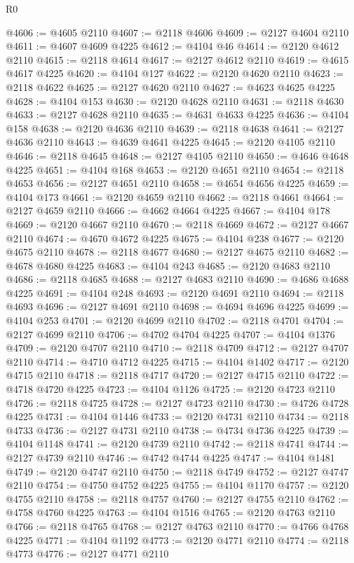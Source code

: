 \begin{lexlean}{R0}
\begin{coremodule}
@4606 := @4605 @2110
@4607 := @2118 @4606
@4609 := @2127 @4604 @2110
@4611 := @4607 @4609 @4225
@4612 := @4104 @46
@4614 := @2120 @4612 @2110
@4615 := @2118 @4614
@4617 := @2127 @4612 @2110
@4619 := @4615 @4617 @4225
@4620 := @4104 @127
@4622 := @2120 @4620 @2110
@4623 := @2118 @4622
@4625 := @2127 @4620 @2110
@4627 := @4623 @4625 @4225
@4628 := @4104 @153
@4630 := @2120 @4628 @2110
@4631 := @2118 @4630
@4633 := @2127 @4628 @2110
@4635 := @4631 @4633 @4225
@4636 := @4104 @158
@4638 := @2120 @4636 @2110
@4639 := @2118 @4638
@4641 := @2127 @4636 @2110
@4643 := @4639 @4641 @4225
@4645 := @2120 @4105 @2110
@4646 := @2118 @4645
@4648 := @2127 @4105 @2110
@4650 := @4646 @4648 @4225
@4651 := @4104 @168
@4653 := @2120 @4651 @2110
@4654 := @2118 @4653
@4656 := @2127 @4651 @2110
@4658 := @4654 @4656 @4225
@4659 := @4104 @173
@4661 := @2120 @4659 @2110
@4662 := @2118 @4661
@4664 := @2127 @4659 @2110
@4666 := @4662 @4664 @4225
@4667 := @4104 @178
@4669 := @2120 @4667 @2110
@4670 := @2118 @4669
@4672 := @2127 @4667 @2110
@4674 := @4670 @4672 @4225
@4675 := @4104 @238
@4677 := @2120 @4675 @2110
@4678 := @2118 @4677
@4680 := @2127 @4675 @2110
@4682 := @4678 @4680 @4225
@4683 := @4104 @243
@4685 := @2120 @4683 @2110
@4686 := @2118 @4685
@4688 := @2127 @4683 @2110
@4690 := @4686 @4688 @4225
@4691 := @4104 @248
@4693 := @2120 @4691 @2110
@4694 := @2118 @4693
@4696 := @2127 @4691 @2110
@4698 := @4694 @4696 @4225
@4699 := @4104 @253
@4701 := @2120 @4699 @2110
@4702 := @2118 @4701
@4704 := @2127 @4699 @2110
@4706 := @4702 @4704 @4225
@4707 := @4104 @1376
@4709 := @2120 @4707 @2110
@4710 := @2118 @4709
@4712 := @2127 @4707 @2110
@4714 := @4710 @4712 @4225
@4715 := @4104 @1402
@4717 := @2120 @4715 @2110
@4718 := @2118 @4717
@4720 := @2127 @4715 @2110
@4722 := @4718 @4720 @4225
@4723 := @4104 @1126
@4725 := @2120 @4723 @2110
@4726 := @2118 @4725
@4728 := @2127 @4723 @2110
@4730 := @4726 @4728 @4225
@4731 := @4104 @1446
@4733 := @2120 @4731 @2110
@4734 := @2118 @4733
@4736 := @2127 @4731 @2110
@4738 := @4734 @4736 @4225
@4739 := @4104 @1148
@4741 := @2120 @4739 @2110
@4742 := @2118 @4741
@4744 := @2127 @4739 @2110
@4746 := @4742 @4744 @4225
@4747 := @4104 @1481
@4749 := @2120 @4747 @2110
@4750 := @2118 @4749
@4752 := @2127 @4747 @2110
@4754 := @4750 @4752 @4225
@4755 := @4104 @1170
@4757 := @2120 @4755 @2110
@4758 := @2118 @4757
@4760 := @2127 @4755 @2110
@4762 := @4758 @4760 @4225
@4763 := @4104 @1516
@4765 := @2120 @4763 @2110
@4766 := @2118 @4765
@4768 := @2127 @4763 @2110
@4770 := @4766 @4768 @4225
@4771 := @4104 @1192
@4773 := @2120 @4771 @2110
@4774 := @2118 @4773
@4776 := @2127 @4771 @2110

\end{coremodule}
\end{lexlean}
